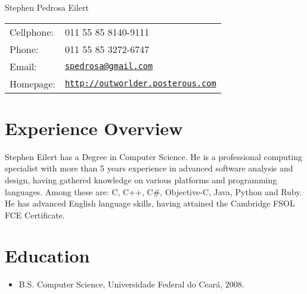 \documentclass[letterpaper]{article}
\def\name{Stephen Pedrosa Eilert}
\begin{document}
\begin{flushright}

{\huge \name}


\vspace{0.25in}
\begin{minipage}{0.45\linewidth}
  \begin{tabular}{ll}
    Cellphone: & 011 55 85 8140-9111 \\
    Phone: &  011 55 85 3272-6747 \\
    Email: & \href{mailto:spedrosa@gmail.com}{\tt spedrosa@gmail.com} \\
    Homepage: & \href{http://outworlder.posterous.com}{\tt http://outworlder.posterous.com} \\
  \end{tabular}
\end{minipage}
\end{flushright}
\section*{Experience Overview}

Stephen Eilert has a Degree in Computer Science. He is a professional computing
specialist with more than 5 years experience in advanced software analysis and design,
having gathered knowledge on various platforms and programming languages. Among these
are: C, C++, C\#, Objective-C, Java, Python and Ruby.
He has advanced English language skills, having attained the Cambridge FSOL FCE
Certificate.


\section*{Education}

\begin{itemize}
  \item B.S. Computer Science, Universidade Federal do Ceará, 2008.
\end{itemize}
\end{document}
